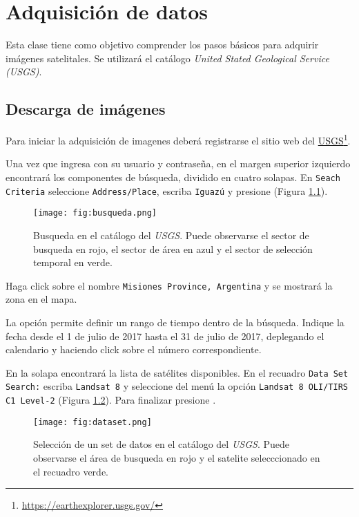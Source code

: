 \chapter{Adquisición de datos}

Esta clase tiene como objetivo comprender los pasos básicos para adquirir imágenes satelitales. Se utilizará el catálogo \emph{United Stated Geological Service (USGS)}.

\section{Descarga de imágenes}

Para iniciar la adquisición de imagenes deberá registrarse el sitio web del \href{https://earthexplorer.usgs.gov/}{USGS}\footnote{\href{https://earthexplorer.usgs.gov/}{https://earthexplorer.usgs.gov/}}.

Una vez que ingresa con su usuario y contraseña, en el margen superior izquierdo encontrará los componentes de búsqueda, dividido en cuatro solapas. En \texttt{Seach Criteria} seleccione \texttt{Address/Place}, escriba \texttt{Iguazú} y presione  (Figura \ref{fig:busqueda}).

\begin{figure}[h!]
    \centering
    \texttt{[image: fig:busqueda.png]}
    \caption{Busqueda en el catálogo del \emph{USGS}. Puede observarse el sector de busqueda en rojo, el sector de área en azul y el sector de selección temporal en verde.}
    \label{fig:busqueda}
\end{figure}

Haga click sobre el nombre \texttt{Misiones Province, Argentina} y se mostrará la zona en el mapa. 

La opción  permite definir un rango de tiempo dentro de la búsqueda. Indique la fecha desde el 1 de julio de 2017 hasta el 31 de julio de 2017, deplegando el calendario y haciendo click sobre el número correspondiente.

En la solapa  encontrará la lista de satélites disponibles. En el recuadro \texttt{Data Set Search:} escriba \texttt{Landsat 8} y seleccione del menú la opción \texttt{Landsat 8 OLI/TIRS C1 Level-2} (Figura \ref{fig:dataset}). Para finalizar presione .

\begin{figure}[h!]
    \centering
    \texttt{[image: fig:dataset.png]}
    \caption{Selección de un set de datos en el catálogo del \emph{USGS}. Puede observarse el área de busqueda en rojo y el satelite selecccionado en el recuadro verde.}
    \label{fig:dataset}
\end{figure}


